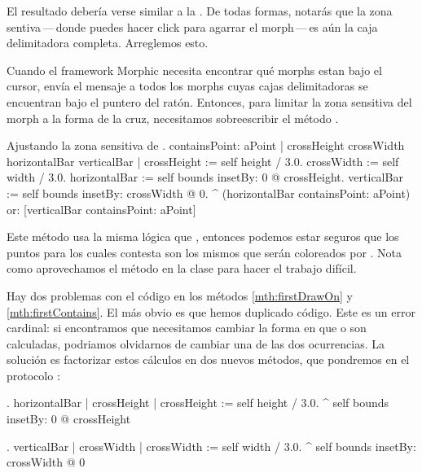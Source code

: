 \documentclass[a4paper,10pt,twoside]{book}
\begin{document}
El resultado deber\'ia verse similar a la .
De todas formas, notar\'as que la zona sentiva\,---\,donde puedes hacer click para agarrar el morph\,---\,es a\'un la caja delimitadora completa.  Arreglemos esto.

Cuando el framework Morphic necesita encontrar qu\'e morphs estan bajo el cursor, env\'ia el mensaje  a todos los morphs cuyas cajas delimitadoras se encuentran bajo el puntero del rat\'on.
Entonces, para limitar la zona sensitiva del morph a la forma de la cruz, necesitamos sobreescribir el m\'etodo .


\begin{method}[firstContains]{Ajustando la zona sensitiva de .}
containsPoint: aPoint
	| crossHeight crossWidth horizontalBar verticalBar |
	crossHeight := self height / 3.0.
	crossWidth := self width / 3.0.
	horizontalBar := self bounds insetBy: 0 @ crossHeight.
	verticalBar := self bounds insetBy: crossWidth @ 0.
	^ (horizontalBar containsPoint: aPoint)
		or: [verticalBar containsPoint: aPoint]
\end{method}

Este m\'etodo usa la misma l\'ogica que , entonces podemos estar seguros que los puntos para los cuales   contesta  son los mismos que ser\'an coloreados por .
Nota como aprovechamos el m\'etodo  en la clase  para hacer el trabajo dif\'icil.

Hay dos problemas con el c\'odigo en los m\'etodos \ref{mth:firstDrawOn} y \ref{mth:firstContains}.
El m\'as obvio es que hemos duplicado c\'odigo.
Este es un error cardinal: si encontramos que necesitamos cambiar la forma en que  o  son calculadas, podriamos olvidarnos de cambiar una de las dos ocurrencias.
La solución es factorizar estos c\'alculos en dos nuevos m\'etodos, que pondremos en el protocolo  :

\begin{method}{.}
horizontalBar
	| crossHeight |
	crossHeight := self height / 3.0.
	^ self bounds insetBy: 0 @ crossHeight
\end{method}

\begin{method}{.}
verticalBar
	| crossWidth |
	crossWidth := self width / 3.0.
	^ self bounds insetBy: crossWidth @ 0
\end{method}
\end{document}
